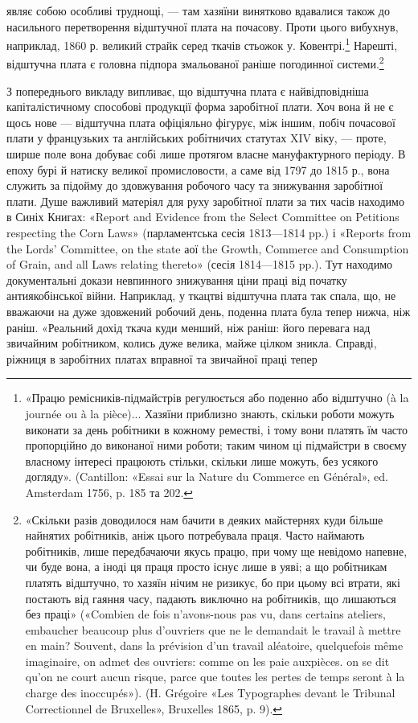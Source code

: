 являє собою особливі труднощі, — там хазяїни винятково вдавалися
також до насильного перетворення відштучної плата на почасову.
Проти цього вибухнув, наприклад, 1860 р. великий страйк
серед ткачів стьожок у. Ковентрі.\footnote{
«Працю ремісників-підмайстрів регулюється або поденно або
відштучно (à la journée ou à la pièce)... Хазяїни приблизно знають,
скільки роботи можуть виконати за день робітники в кожному реместві,
і тому вони платять їм часто пропорційно до виконаної ними роботи;
таким чином ці підмайстри в своєму власному інтересі працюють стільки,
скільки лише можуть, без усякого догляду». (Cantillon: «Essai sur la
Nature du Commerce en Général», ed. Amsterdam 1756, p. 185 та 202.
} Нарешті, відштучна плата
є головна підпора змальованої раніше погодинної системи.\footnote{
«Скільки разів доводилося нам бачити в деяких майстернях куди
більше найнятих робітників, аніж цього потребувала праця. Часто наймають
робітників, лише передбачаючи якусь працю, при чому ще невідомо
напевне, чи буде вона, а іноді ця праця просто існує лише в уяві;
а що робітникам платять відштучно, то хазяїн нічим не ризикує, бо при
цьому всі втрати, які постають від гаяння часу, падають виключно на
робітників, що лишаються без праці» («Combien de fois n’avons-nous
pas vu, dans certains ateliers, embaucher beaucoup plus d’ouvriers que
ne le demandait le travail à mettre en main? Souvent, dans la prévision
d’un travail aléatoire, quelquefois même imaginaire, on admet des ouvriers:
comme on les paie auxpièces. on se dit qu’on ne court aucun risque, parce
que toutes les pertes de temps seront à la charge des inoccupés»). (H. Grégoire
«Les Typographes devant le Tribunal Correctionnel de Bruxelles»,
Bruxelles 1865, p. 9).
}

З попереднього викладу випливає, що відштучна плата є найвідповідніша
капіталістичному способові продукції форма заробітної
плати. Хоч вона й не є щось нове — відштучна плата офіціяльно
фігурує, між іншим, побіч почасової плати у французьких
та англійських робітничих статутах XIV віку, — проте, ширше
поле вона добуває собі лише протягом власне мануфактурного
періоду. В епоху бурі й натиску великої промисловости, а саме
від 1797 до 1815 р., вона служить за підойму до здовжування
робочого часу та знижування заробітної плати. Душе важливий
матеріял для руху заробітної плати за тих часів находимо в
Синіх Книгах: «Report and Evidence from the Select Committee
on Petitions respecting the Corn Laws» (парламентська сесія
1813—1814 pp.) і «Reports from the Lords’ Committee, on the
state аої the Growth, Commerce and Consumption of Grain, and
all Laws relating thereto» (сесія 1814—1815 pp.). Тут находимо
документальні докази невпинного знижування ціни праці від
початку антиякобінської війни. Наприклад, у ткацтві відштучна
плата так спала, що, не вважаючи на дуже здовжений робочий
день, поденна плата була тепер нижча, ніж раніш. «Реальний дохід
ткача куди менший, ніж раніш: його перевага над звичайним
робітником, колись дуже велика, майже цілком зникла. Справді,
ріжниця в заробітних платах вправної та звичайної праці тепер

